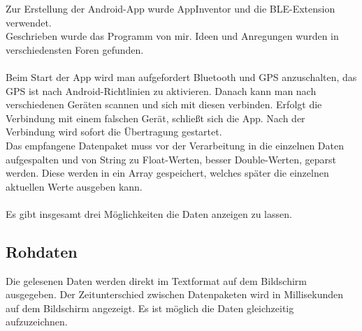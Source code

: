 Zur Erstellung der Android-App wurde AppInventor und 
die BLE-Extension verwendet.\\
Geschrieben wurde das Programm von mir. Ideen und Anregungen wurden in verschiedensten 
Foren gefunden. \\
\\
Beim Start der App wird man aufgefordert Bluetooth und GPS anzuschalten, das GPS
ist nach Android-Richtlinien zu aktivieren. Danach kann man nach verschiedenen
Geräten scannen und sich mit diesen verbinden. Erfolgt die Verbindung mit einem
falschen Gerät, schließt sich die App. Nach der Verbindung wird sofort die Übertragung 
gestartet.\\
Das empfangene Datenpaket muss vor der Verarbeitung in die einzelnen Daten
aufgespalten und von String zu Float-Werten, besser Double-Werten, geparst werden.
Diese werden in ein Array gespeichert, welches später
die einzelnen aktuellen Werte ausgeben kann.\\
\\
Es gibt insgesamt drei Möglichkeiten die Daten anzeigen zu lassen.

\subsection{Rohdaten}
Die gelesenen Daten werden direkt im Textformat auf dem Bildschirm ausgegeben.
Der Zeitunterschied zwischen Datenpaketen wird in Millisekunden auf dem Bildschirm
angezeigt.
Es ist möglich die Daten gleichzeitig aufzuzeichnen.

